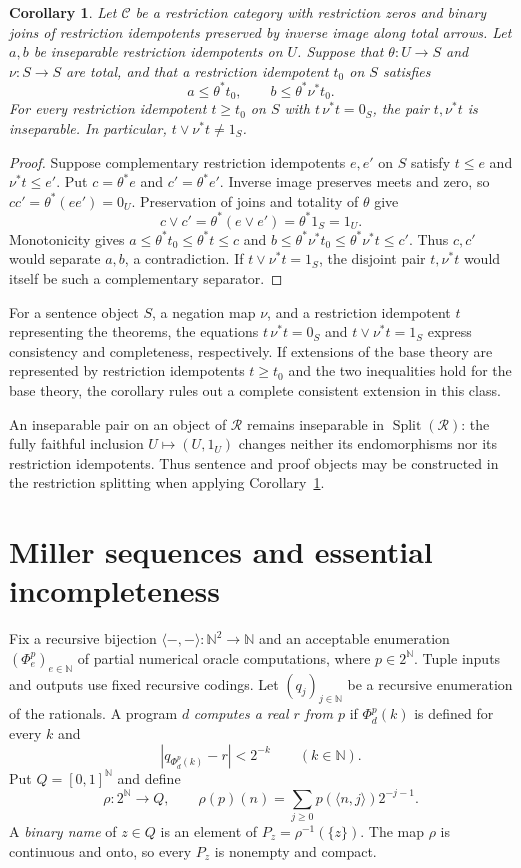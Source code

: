 \documentclass[11pt]{article}
\newtheorem{corollary}[theorem]{Corollary}
\newcommand{\N}{\mathbb N}
\begin{document}
\begin{corollary}\label{cor:domain-incompleteness}
Let $\mathcal C$ be a restriction category with restriction zeros and
binary joins of restriction idempotents preserved by inverse image along total arrows.
Let $a,b$ be inseparable restriction idempotents on $U$. Suppose that
$\theta:U\to S$ and $\nu:S\to S$ are total, and that a restriction
idempotent $t_0$ on $S$ satisfies
\[
 a\le\theta^*t_0,\qquad b\le\theta^*\nu^*t_0.
\]
For every restriction idempotent $t\ge t_0$ on $S$ with $t\,\nu^*t=0_S$,
the pair $t,\nu^*t$ is inseparable. In particular,
$t\vee\nu^*t\ne1_S$.
\end{corollary}
\begin{proof}
Suppose complementary restriction idempotents $e,e'$ on $S$ satisfy
$t\le e$ and $\nu^*t\le e'$. Put
$c=\theta^*e$ and $c'=\theta^*e'$. Inverse image preserves
meets and zero, so $cc'=\theta^*(ee')=0_U$.
Preservation of joins and totality of $\theta$ give
\[
 c\vee c'=\theta^*(e\vee e')=\theta^*1_S=1_U.
\]
Monotonicity gives
$a\le\theta^*t_0\le\theta^*t\le c$ and
$b\le\theta^*\nu^*t_0\le\theta^*\nu^*t\le c'$.
Thus $c,c'$ would separate $a,b$, a contradiction.
If $t\vee\nu^*t=1_S$, the disjoint pair $t,\nu^*t$ would
itself be such a complementary separator.
\end{proof}

For a sentence object $S$, a negation map $\nu$, and a restriction
idempotent $t$ representing the theorems, the equations
$t\,\nu^*t=0_S$ and $t\vee\nu^*t=1_S$
express consistency and completeness, respectively.
If extensions of the base theory are represented by restriction
idempotents $t\ge t_0$ and the two inequalities hold for the base
theory, the corollary rules out a complete consistent extension
in this class.

An inseparable pair on an object of $\mathscr R$ remains inseparable
in $\operatorname{Split}(\mathscr R)$: the fully faithful inclusion
$U\mapsto(U,1_U)$ changes neither its endomorphisms nor its restriction idempotents.
Thus sentence and proof objects may be constructed in the restriction
splitting when applying Corollary~\ref{cor:domain-incompleteness}.

\section{Miller sequences and essential incompleteness}\label{sec:miller}

Fix a recursive bijection $\langle-,-\rangle:\N^2\to\N$ and an
acceptable enumeration $(\Phi_e^p)_{e\in\N}$ of partial numerical
oracle computations, where $p\in2^{\N}$. Tuple inputs and outputs use
fixed recursive codings. Let $(q_j)_{j\in\N}$ be a recursive enumeration
of the rationals. A program $d$ \emph{computes a real $r$ from $p$}
if $\Phi_d^p(k)$ is defined for every $k$ and
\[
 |q_{\Phi_d^p(k)}-r|<2^{-k}\qquad(k\in\N).
\]
Put $Q=[0,1]^{\N}$ and define
\[
 \rho:2^{\N}\longrightarrow Q,\qquad
 \rho(p)(n)=\sum_{j\geq0}p(\langle n,j\rangle)2^{-j-1}.
\]
A \emph{binary name} of $z\in Q$ is an element of
$P_z=\rho^{-1}(\{z\})$. The map $\rho$ is continuous and onto,
so every $P_z$ is nonempty and compact.
\end{document}
